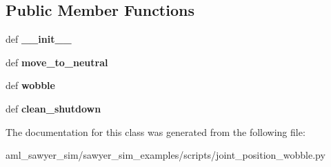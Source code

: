 \subsection*{Public Member Functions}
\begin{DoxyCompactItemize}
\item 
\hypertarget{classjoint__position__wobble_1_1_intera_s_d_k_test_a78bef0733236efcad9dedd194cc32e28}{def {\bfseries \-\_\-\-\_\-init\-\_\-\-\_\-}}\label{classjoint__position__wobble_1_1_intera_s_d_k_test_a78bef0733236efcad9dedd194cc32e28}

\item 
\hypertarget{classjoint__position__wobble_1_1_intera_s_d_k_test_a67a15e3e6944667062bb2c24f657d78c}{def {\bfseries move\-\_\-to\-\_\-neutral}}\label{classjoint__position__wobble_1_1_intera_s_d_k_test_a67a15e3e6944667062bb2c24f657d78c}

\item 
\hypertarget{classjoint__position__wobble_1_1_intera_s_d_k_test_a222f39bd20f59deac11d4e6460811005}{def {\bfseries wobble}}\label{classjoint__position__wobble_1_1_intera_s_d_k_test_a222f39bd20f59deac11d4e6460811005}

\item 
\hypertarget{classjoint__position__wobble_1_1_intera_s_d_k_test_a771d6462fcc705ae94677d647001a3a8}{def {\bfseries clean\-\_\-shutdown}}\label{classjoint__position__wobble_1_1_intera_s_d_k_test_a771d6462fcc705ae94677d647001a3a8}

\end{DoxyCompactItemize}


The documentation for this class was generated from the following file\-:\begin{DoxyCompactItemize}
\item 
aml\-\_\-sawyer\-\_\-sim/sawyer\-\_\-sim\-\_\-examples/scripts/joint\-\_\-position\-\_\-wobble.\-py\end{DoxyCompactItemize}
